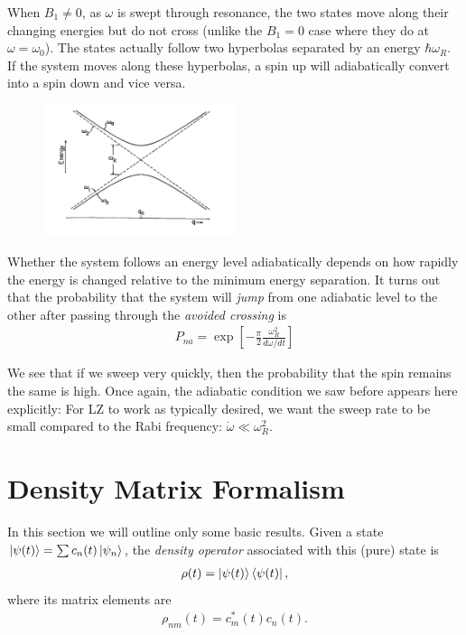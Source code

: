 \documentclass{book}
\theoremstyle{definition}
\newcommand{\f}[2]{\frac{#1}{#2}}
\newcommand{\lb}{\left[}
\newcommand{\rb}{\right]}
\begin{document}
When $B_1 \neq 0$, as $\omega$ is swept through resonance, the two states move along their changing energies but do not cross (unlike the $B_1 = 0$ case where they do at $\omega = \omega_0$). The states actually follow two hyperbolas separated by an energy $\hbar \omega_R$. If the system moves along these hyperbolas, a spin up will adiabatically convert into a spin down and vice versa. 


\begin{figure}[!htb]
	\centering
	\includegraphics[width=0.5\textwidth]{figures/LZ}
\end{figure}


Whether the system follows an energy level adiabatically depends on how rapidly the energy is changed relative to the minimum energy separation. It turns out that the probability that the system will \textit{jump} from one adiabatic level to the other after passing through the \textit{avoided crossing} is 
\begin{align*}
	\boxed{P_{na} = \exp\lb - \f{\pi}{2} \f{\omega_R^2}{ d\omega/dt} \rb}
\end{align*}

We see that if we sweep very quickly, then the probability that the spin remains the same is high. Once again, the adiabatic condition we saw before appears here explicitly: For LZ to work as typically desired, we want the sweep rate to be small compared to the Rabi frequency: $\dot \omega \ll \omega_R^2$.





\section{Density Matrix Formalism}


In this section we will outline only some basic results. Given a state $\ket{\psi(t)} = \sum c_n(t) \ket{\psi_n}$, the \textit{density operator} associated with this (pure) state is 
\begin{align*}
	\rho(t) = \ket{\psi(t)} \bra{\psi(t)},
\end{align*}
where its matrix elements are
\begin{align*}
	\rho_{nm}(t) = c_m^*(t) c_n(t). 
\end{align*}
\end{document}
